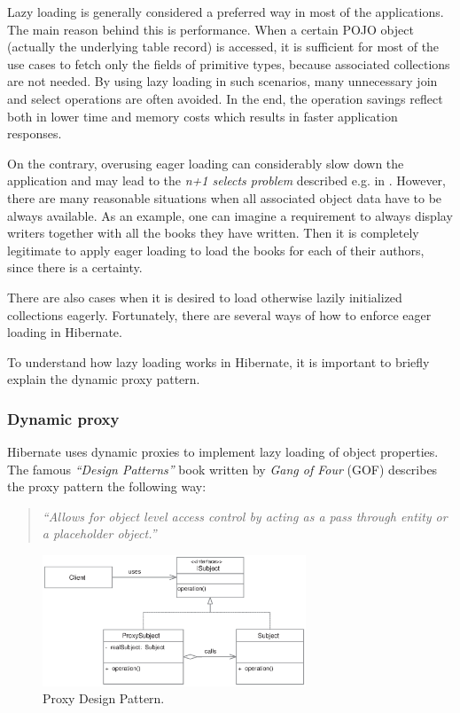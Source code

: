 \documentclass[12pt, oneside, a4paper]{book}
\begin{document}
Lazy loading is generally considered a preferred way in most of the applications.
The main reason behind this is performance.
When a certain POJO object (actually the underlying table record) is accessed, it is sufficient for most of the use cases to fetch only the fields of primitive types, because associated collections are not needed. 
By using lazy loading in such scenarios, many unnecessary join and select operations are often avoided. 
In the end, the operation savings reflect both in lower time and memory costs which results in faster application responses. 

On the contrary, overusing eager loading can considerably slow down the application and may lead to the \textit{n+1 selects problem} described e.g. in \cite{HibernateInAction:2004}.	
However, there are many reasonable situations when all associated object data have to be always available. 
As an example, one can imagine a requirement to always display writers together with all the books they have written. 
Then it is completely legitimate to apply eager loading to load the books for each of their authors, since there is a certainty.

There are also cases when it is desired to load otherwise lazily initialized collections eagerly.
Fortunately, there are several ways of how to enforce eager loading in Hibernate.

To understand how lazy loading works in Hibernate, it is important to briefly explain the dynamic proxy pattern. 

\subsubsection{Dynamic proxy}

Hibernate uses dynamic proxies to implement lazy loading of object properties. 
The famous \textit{``Design Patterns''} book written by \textit{Gang of Four} (GOF) \cite{GOF:DesignPatterns} describes the proxy pattern the following way:

\begin{quote}		
\textit{``Allows for object level access control by acting as a pass through entity or a placeholder object.''}
\end{quote}


\begin{figure}[h]
	\centering
		\includegraphics[width=0.7\textwidth]{figures/proxy.eps}
	\caption{Proxy Design Pattern.}
	\label{fig:proxy}
\end{figure}
\end{document}
